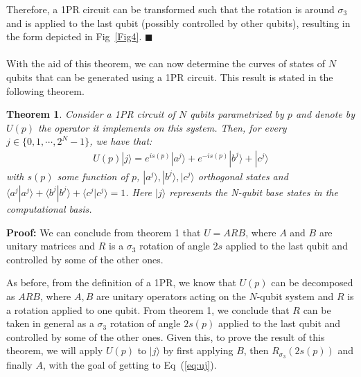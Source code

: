 \documentclass[10pt,letterpaper]{article} %
\newcommand{\fref}[1]{Fig~\ref{#1}}
\newcommand{\eref}[1]{Eq~(\ref{#1})}
\newtheorem{theorem}{Theorem}
\begin{document}
Therefore, a 1PR circuit can be transformed such
that the rotation is around $\sigma_3$ and is applied to the last qubit 
(possibly controlled by other qubits), 
resulting in the form depicted in \fref{Fig4}. 
$\blacksquare$ \\
$\;$\\

With the aid of this theorem, we can now determine the curves
of states of $N$ qubits that can be generated using a 1PR circuit. 
This result is stated in the following theorem.

\begin{theorem}
\label{theorem2}
Consider a 1PR circuit of $N$ qubits parametrized by $p$
and denote by $U(p)$ the operator it implements on this system. 
Then, for every $j \in \{0, 1, \cdots, 2^N-1\}$, 
we have that:
\begin{align}
U(p)|j\rangle = e^{is(p)} |a^j\rangle + e^{-is(p)} |b^j\rangle + |c^j\rangle
\label{eq:uj}
\end{align}
with $s(p)$ some function of $p$,  $|a^j\rangle ,|b^j\rangle, |c^j\rangle$ orthogonal states   and $\langle a^j| a^j\rangle + \langle b^j| b^j\rangle + \langle
c^j|c^j \rangle = 1$. Here $|j\rangle$ represents the N-qubit base states in the computational basis.
\end{theorem}
\textbf{Proof:}   
We can conclude from theorem 1 that $U=ARB$,
where $A$ and $B$ are unitary matrices and $R$ is a $\sigma_3$ rotation of angle $2s$
applied to the last qubit and controlled by some of the other ones. 

{\color{green} As before, from the definition of a 1PR, we know that $U(p)$ can be decomposed as $ARB$, where 
$A,B$ are unitary operators acting on the $N$-qubit system
and $R$ is a rotation applied to one qubit.
From theorem 1, we conclude that $R$ can be taken in general as a $\sigma_3$
rotation of angle $2s(p)$ applied to the last qubit and controlled by some of the other ones.
Given  this, to prove the result of this theorem,
we will apply $U(p)$ to $|j\rangle$ by first applying $B$,
then $R_{\sigma_3}(2s(p))$ and finally $A$, with
the goal of getting to \eref{eq:uj}. }
\end{document}
